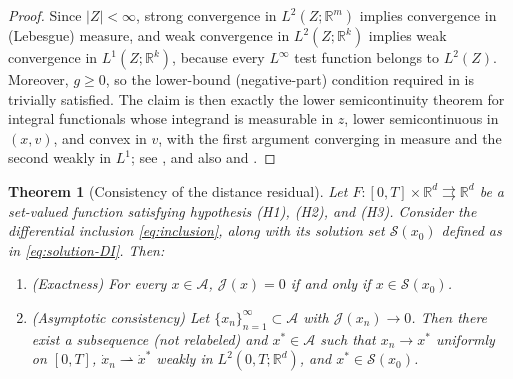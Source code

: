 \documentclass[11pt]{elsarticle}
\newtheorem{theorem}{Theorem}[section]
\theoremstyle{definition}
\theoremstyle{remark}
\numberwithin{equation}{section}
\begin{document}
	\begin{proof}
		Since $|Z|<\infty$, strong convergence in $L^2(Z;\mathbb{R}^m)$
		implies convergence in (Lebesgue) measure, and weak convergence in
		$L^2(Z;\mathbb{R}^k)$ implies weak convergence in
		$L^1(Z;\mathbb{R}^k)$, because every $L^\infty$ test function
		belongs to $L^2(Z)$. Moreover, $g\ge0$, so the lower-bound
		(negative-part) condition required in
		\cite[Theorem~1]{berkovitz_1974} is trivially satisfied. The claim
		is then exactly the lower semicontinuity theorem for integral
		functionals whose integrand is measurable in $z$, lower
		semicontinuous in $(x,v)$, and convex in $v$, with the first
		argument converging in measure and the second weakly in $L^1$; see
		\cite[Theorem~1]{berkovitz_1974}, and also \cite{ioffe_1977} and
		\cite[Chapter~VIII]{ekeland_temam_1999}.
	\end{proof}
	
	\begin{theorem}[Consistency of the distance residual] \label{thm:consistency}
		Let $F:[0,T]\times\mathbb{R}^d\rightrightarrows\mathbb{R}^d$ be a set-valued function satisfying hypothesis \textup{(H1)}, \textup{(H2)}, and \textup{(H3)}.
		Consider the differential inclusion \eqref{eq:inclusion}, along with its
		solution set $\mathcal{S}(x_0)$ defined as in \eqref{eq:solution-DI}.
		Then:
		\begin{enumerate}
			\item[\rm(a)] (Exactness) For every $x \in \mathcal{A}$, $\mathcal{J}(x) = 0$ if and only if $x \in \mathcal{S}(x_0)$.
			\item[\rm(b)] (Asymptotic consistency) Let $\{x_n\}_{n=1}^{\infty} \subset \mathcal{A}$ with $\mathcal{J}(x_n) \to 0$. Then there exist a subsequence (not relabeled) and $x^* \in \mathcal{A}$ such that $x_n \to x^*$ uniformly on $[0,T]$, $\dot{x}_n \rightharpoonup \dot{x}^*$ weakly in $L^2(0,T; \mathbb{R}^d)$, and $x^* \in \mathcal{S}(x_0)$.
		\end{enumerate}
	\end{theorem}
	
\end{document}

